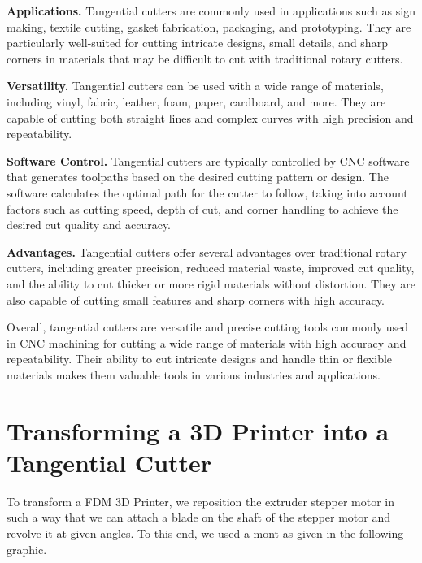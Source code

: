 \noindent\textbf{Applications.}
Tangential cutters are commonly used in applications such as sign making, textile cutting, gasket fabrication, packaging, and prototyping.
They are particularly well-suited for cutting intricate designs, small details, and sharp corners in materials that may be difficult to cut with traditional rotary cutters.

\noindent\textbf{Versatility.}
Tangential cutters can be used with a wide range of materials, including vinyl, fabric, leather, foam, paper, cardboard, and more.
They are capable of cutting both straight lines and complex curves with high precision and repeatability.

\noindent\textbf{Software Control.}
Tangential cutters are typically controlled by CNC software that generates toolpaths based on the desired cutting pattern or design.
The software calculates the optimal path for the cutter to follow, taking into account factors such as cutting speed, depth of cut, and corner handling to achieve the desired cut quality and accuracy.

\noindent\textbf{Advantages.}
Tangential cutters offer several advantages over traditional rotary cutters, including greater precision, reduced material waste, improved cut quality, and the ability to cut thicker or more rigid materials without distortion.
They are also capable of cutting small features and sharp corners with high accuracy.

Overall, tangential cutters are versatile and precise cutting tools commonly used in CNC machining for cutting a wide range of materials with high accuracy and repeatability.
Their ability to cut intricate designs and handle thin or flexible materials makes them valuable tools in various industries and applications.

\section{Transforming a 3D Printer into a Tangential Cutter}

To transform a FDM 3D Printer,
we reposition the extruder stepper motor in such a way that
we can attach a blade on the shaft of the stepper motor and revolve it at given angles.
To this end, we used a mont as given in the following graphic.


